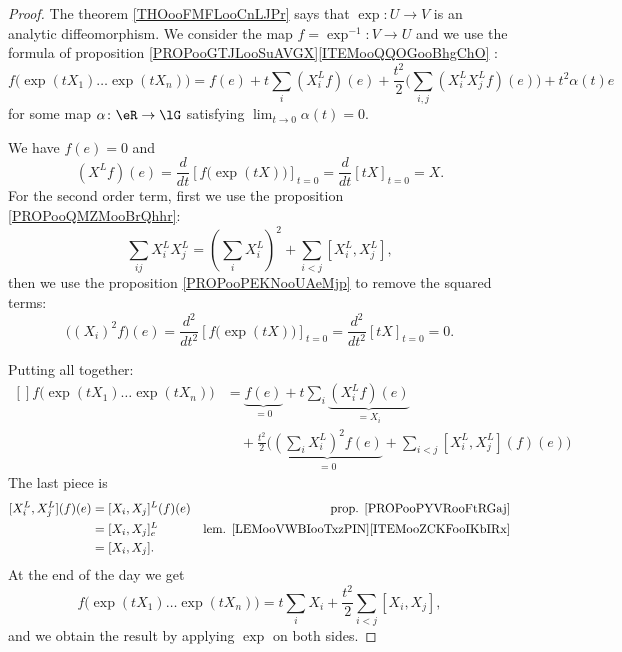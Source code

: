 \begin{proof}
	The theorem \ref{THOooFMFLooCnLJPr} says that \(\exp \colon U\to V  \) is an analytic diffeomorphism. We consider the map \(f=\exp^{-1} \colon V\to U  \) and we use the formula of proposition \ref{PROPooGTJLooSuAVGX}\ref{ITEMooQQOGooBhgChO} :
	\begin{equation}
		f\big( \exp(tX_1)\ldots \exp(tX_n) \big)=f(e)+t\sum_i(X_i^Lf)(e)+\frac{ t^2 }{2}\Big( \sum_{i,j}(X^L_iX^L_jf)(e) \Big) + t^2\alpha(t)
		e\end{equation}
	for some map \(\alpha \colon \eR\to \lG  \) satisfying \( \lim_{t\to 0}\alpha(t)=0\).

	We have \( f(e)=0\) and
	\begin{equation}
		(X^Lf)(e)=\frac{d}{dt} \left[ f\big( \exp(tX) \big)  \right]_{t=0}=\frac{d}{dt} \left[ tX  \right]_{t=0}=X.
	\end{equation}
	For the second order term, first we use the proposition \ref{PROPooQMZMooBrQhhr}:
	\begin{equation}
		\sum_{ij}X_i^LX_j^L=(\sum_iX_i^L)^2+\sum_{i<j}[X_i^L,X_j^L],
	\end{equation}
	then we use the proposition \ref{PROPooPEKNooUAeMjp} to remove the squared terms:
	\begin{equation}
		\big( (X_i)^2f \big)(e)=\frac{d^2}{dt^2} \left[ f\big( \exp(tX) \big)  \right]_{t=0}=\frac{d^2}{dt^2} \left[   tX  \right]_{t=0}=0.
	\end{equation}

	Putting all together:
	\begin{equation}
		\begin{aligned}[]
			f\big( \exp(tX_1)\ldots \exp(tX_n) \big) & =\underbrace{f(e)}_{=0}+t\sum_i\underbrace{(X_i^Lf)(e)}_{=X_i}                                        \\
			                                         & \quad+\frac{ t^2 }{2}\Big( \underbrace{(\sum_iX_i^L)^2f(e)}_{=0} +\sum_{i<j}[X_i^L,X_j^L](f)(e) \Big)
		\end{aligned}
	\end{equation}
	The last piece is
	\begin{subequations}
		\begin{align}
			[X_i^L,X_j^L](f)(e) & =[X_i,X_j]^L(f)(e) & \text{prop. \ref{PROPooPYVRooFtRGaj}}                       \\
			                    & =[X_i,X_j]^L_e     & \text{lem. \ref{LEMooVWBIooTxzPIN}\ref{ITEMooZCKFooIKbIRx}} \\
			                    & =[X_i,X_j].
		\end{align}
	\end{subequations}
	At the end of the day we get
	\begin{equation}
		f\big( \exp(tX_1)\ldots \exp(tX_n) \big)=t\sum_iX_i+\frac{ t^2 }{2}\sum_{i<j}[X_i,X_j],
	\end{equation}
	and we obtain the result by applying \( \exp\) on both sides.
\end{proof}

